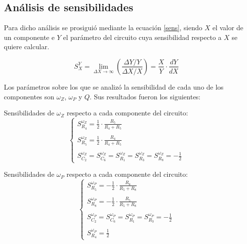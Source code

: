 \subsection{An\'alisis de sensibilidades}

Para dicho an\'alisis se prosigui\'o mediante la ecuaci\'on \ref{sens}, siendo $X$ el valor de un componente e $Y$ el par\'ametro del circuito cuya sensibilidad respecto a $X$ se quiere calcular.

\begin{equation}
S^{Y}_{X}= \lim_{\Delta X \to \infty} \left(\frac{\Delta Y / Y}{\Delta X / X}\right) = \frac{X}{Y}\cdot\frac{dY}{dX}
\label{sens}
\end{equation}

Los par\'ametros sobre los que se analiz\'o la sensibilidad de cada uno de los componentes son $\omega_Z$, $\omega_P$ y $Q$. Sus resultados fueron los siguientes:

Sensibilidades de $\omega_Z$ respecto a cada componente del circuito:
\begin{equation}
	\begin{cases}
	S^{\omega_Z}_{R_4}= \frac{1}{2} \cdot \frac{R_{5}}{R_{4} + R_{5}}\\ \\
	S^{\omega_Z}_{R_5}= \frac{1}{2} \cdot \frac{R_{4}}{R_{4} + R_{5}}\\ \\
		S^{\omega_Z}_{C_2} = S^{\omega_Z}_{C_6}= S^{\omega_Z}_{R_1}=S^{\omega_Z}_{R_3}=S^{\omega_Z}_{R_8}    =- \frac{1}{2} 
	\end{cases}
\end{equation}

Sensibilidades de $\omega_P$ respecto a cada componente del circuito:
\begin{equation}
\begin{cases}
	S^{\omega_P}_{R_5} =	-  \frac{1}{2} \cdot \frac{R_{8}}{R_{5} + R_{8}} \\ \\
	S^{\omega_P}_{R_8} =	-  \frac{1}{2} \cdot \frac{R_{5}}{R_{5} + R_{8}}\\ \\
	S^{\omega_P}_{C_2} = S^{\omega_P}_{C_6}= S^{\omega_P}_{R_1}=S^{\omega_P}_{R_3}=	-  \frac{1}{2}\\ \\
	S^{\omega_P}_{R_4} = \frac{1}{2}
	\end{cases}
\end{equation}

